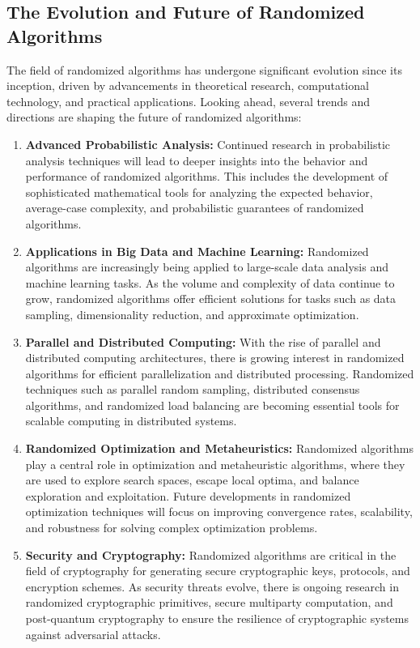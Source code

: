 \documentclass[12pt]{book} %
\begin{document}
\subsection{The Evolution and Future of Randomized Algorithms}

The field of randomized algorithms has undergone significant evolution since its inception, driven by advancements in theoretical research, computational technology, and practical applications. Looking ahead, several trends and directions are shaping the future of randomized algorithms:

\begin{enumerate}
    \item \textbf{Advanced Probabilistic Analysis:} Continued research in probabilistic analysis techniques will lead to deeper insights into the behavior and performance of randomized algorithms. This includes the development of sophisticated mathematical tools for analyzing the expected behavior, average-case complexity, and probabilistic guarantees of randomized algorithms.
    
    \item \textbf{Applications in Big Data and Machine Learning:} Randomized algorithms are increasingly being applied to large-scale data analysis and machine learning tasks. As the volume and complexity of data continue to grow, randomized algorithms offer efficient solutions for tasks such as data sampling, dimensionality reduction, and approximate optimization.
    
    \item \textbf{Parallel and Distributed Computing:} With the rise of parallel and distributed computing architectures, there is growing interest in randomized algorithms for efficient parallelization and distributed processing. Randomized techniques such as parallel random sampling, distributed consensus algorithms, and randomized load balancing are becoming essential tools for scalable computing in distributed systems.
    
    \item \textbf{Randomized Optimization and Metaheuristics:} Randomized algorithms play a central role in optimization and metaheuristic algorithms, where they are used to explore search spaces, escape local optima, and balance exploration and exploitation. Future developments in randomized optimization techniques will focus on improving convergence rates, scalability, and robustness for solving complex optimization problems.
    
    \item \textbf{Security and Cryptography:} Randomized algorithms are critical in the field of cryptography for generating secure cryptographic keys, protocols, and encryption schemes. As security threats evolve, there is ongoing research in randomized cryptographic primitives, secure multiparty computation, and post-quantum cryptography to ensure the resilience of cryptographic systems against adversarial attacks.
\end{enumerate}
\end{document}
